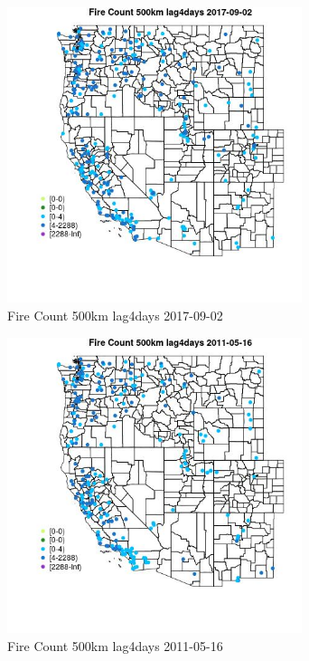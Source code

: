 \begin{figure} 
\centering  
\includegraphics[width=0.77\textwidth]{Code_Outputs/Report_ML_input_PM25_Step4_part_e_de_duplicated_aves_compiled_2019-05-21wNAs_MapObsFire_Count_500km_lag4days2017-09-02.jpg} 
\caption{\label{fig:Report_ML_input_PM25_Step4_part_e_de_duplicated_aves_compiled_2019-05-21wNAsMapObsFire_Count_500km_lag4days2017-09-02}Fire Count 500km lag4days 2017-09-02} 
\end{figure} 
 

\begin{figure} 
\centering  
\includegraphics[width=0.77\textwidth]{Code_Outputs/Report_ML_input_PM25_Step4_part_e_de_duplicated_aves_compiled_2019-05-21wNAs_MapObsFire_Count_500km_lag4days2011-05-16.jpg} 
\caption{\label{fig:Report_ML_input_PM25_Step4_part_e_de_duplicated_aves_compiled_2019-05-21wNAsMapObsFire_Count_500km_lag4days2011-05-16}Fire Count 500km lag4days 2011-05-16} 
\end{figure} 
 

